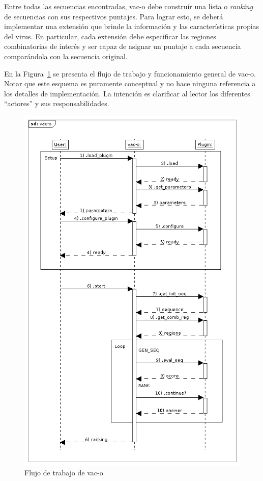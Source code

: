\documentclass[10pt,a4paper]{article}
\begin{document}
    Entre todas las secuencias encontradas, vac-o debe construir una lista o
\textit{ranking} de secuencias con sus respectivos puntajes. Para lograr esto,
se deber\'a implementar una extensi\'on que brinde la informaci\'on y las
caracter\'isticas propias del virus. En particular, cada extensi\'on debe
especificar las regiones combinatorias de inter\'es y ser capaz de asignar un
puntaje a cada secuencia compar\'andola con la secuencia original. 

    En la Figura~\ref{fig:1} se presenta el flujo de trabajo y funcionamiento
general de vac-o. Notar que este esquema es puramente conceptual y no hace
ninguna referencia a los detalles de implementaci\'on. La intenci\'on es
clarificar al lector los diferentes ``actores'' y sus responsabilidades.
    \begin{figure}
	    \centering
	    \includegraphics[scale=0.65]{seq-diagram.png}
	    \caption{Flujo de trabajo de vac-o}
	    \label{fig:1}
    \end{figure}
\end{document}
